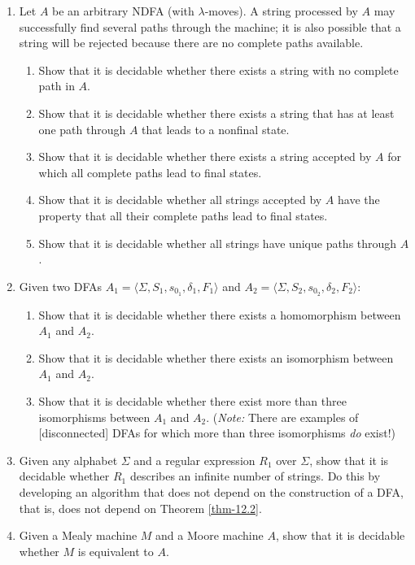 \begin{enumerate}[{12.}1.]
\item Let $A$ be an arbitrary NDFA (with $\lambda$-moves). A string processed by
$A$ may successfully find several paths through the machine; it is also possible
that a string will be rejected because there are no complete paths available.
\begin{enumerate}
\item Show that it is decidable whether there exists a string with no complete
path in $A$.
\item Show that it is decidable whether there exists a string that has at least
one path through $A$ that leads to a nonfinal state.
\item Show that it is decidable whether there exists a string accepted by $A$
for which all complete paths lead to final states.
\item Show that it is decidable whether all strings accepted by $A$ have the
property that all their complete paths lead to final states.
\item Show that it is decidable whether all strings have unique paths through
$A$.
\end{enumerate}

\item Given two DFAs $A_1=\langle\Sigma,S_1,s_{0_1},\delta_1,F_1\rangle$ and
$A_2=\langle\Sigma,S_2,s_{0_2},\delta_2,F_2\rangle$:
\begin{enumerate}
\item Show that it is decidable whether there exists a homomorphism between
$A_1$ and $A_2$.
\item Show that it is decidable whether there exists an isomorphism between
$A_1$ and $A_2$.
\item Show that it is decidable whether there exist more than three isomorphisms
between $A_1$ and $A_2$. (\emph{Note:} There are examples of [disconnected] DFAs
for which more than three isomorphisms \emph{do} exist!)
\end{enumerate}

\item Given any alphabet $\Sigma$ and a regular expression $R_1$ over $\Sigma$,
show that it is decidable whether $R_1$ describes an infinite number of strings.
Do this by developing an algorithm that does not depend on the construction of a
DFA, that is, does not depend on Theorem \ref{thm-12.2}.

\item Given a Mealy machine $M$ and a Moore machine $A$, show that it is
decidable whether $M$ is equivalent to $A$.


\end{enumerate}
